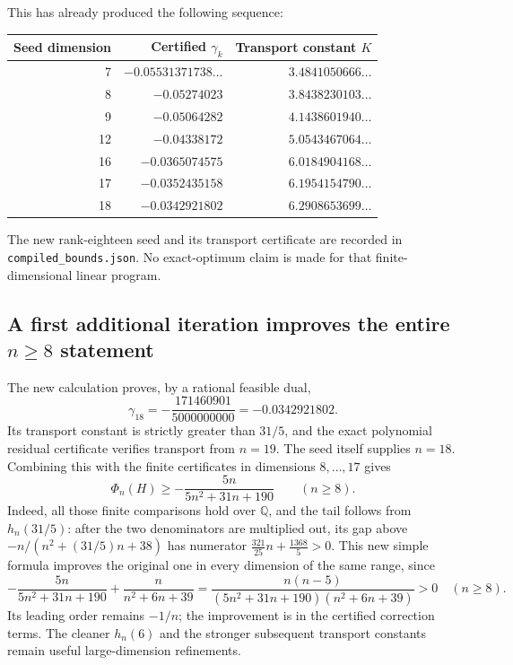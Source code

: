 \documentclass[11pt]{article}
\newcommand{\Q}{\mathbb Q}
\begin{document}
This has already produced the following sequence:
\begin{center}
\begin{tabular}{rrr}
\toprule
Seed dimension & Certified $\gamma_k$ & Transport constant $K$\\
\midrule
7&$-0.05531371738\ldots$&$3.4841050666\ldots$\\
8&$-0.05274023$&$3.8438230103\ldots$\\
9&$-0.05064282$&$4.1438601940\ldots$\\
12&$-0.04338172$&$5.0543467064\ldots$\\
16&$-0.0365074575$&$6.0184904168\ldots$\\
17&$-0.0352435158$&$6.1954154790\ldots$\\
18&$-0.0342921802$&$6.2908653699\ldots$\\
\bottomrule
\end{tabular}
\end{center}
The new rank-eighteen seed and its transport certificate are recorded in
\texttt{compiled\_bounds.json}. No exact-optimum claim is made for that
finite-dimensional linear program.

\subsection{A first additional iteration improves the entire $n\ge8$ statement}
The new calculation proves, by a rational feasible dual,
\[
 \gamma_{18}=-\frac{171460901}{5000000000}=-0.0342921802.
\]
Its transport constant is strictly greater than $31/5$, and the exact
polynomial residual certificate verifies transport from $n=19$. The seed
itself supplies $n=18$. Combining this with the finite certificates in
dimensions $8,\ldots,17$ gives
\[
 \boxed{\Phi_n(H)\ge-\frac{5n}{5n^2+31n+190}\qquad(n\ge8).}
\]
Indeed, all those finite comparisons hold over $\Q$, and the tail follows
from $h_n(31/5)$: after the two denominators are multiplied out, its gap above
$-n/(n^2+(31/5)n+38)$ has numerator
$\frac{321}{25}n+\frac{1368}{5}>0$.
This new simple formula improves the original one in every dimension of the
same range, since
\[
 -\frac{5n}{5n^2+31n+190}+\frac{n}{n^2+6n+39}
 =\frac{n(n-5)}{(5n^2+31n+190)(n^2+6n+39)}>0\quad(n\ge8).
\]
Its leading order remains $-1/n$; the improvement is in the certified
correction terms. The cleaner $h_n(6)$ and the stronger subsequent
transport constants remain useful large-dimension refinements.
\end{document}
